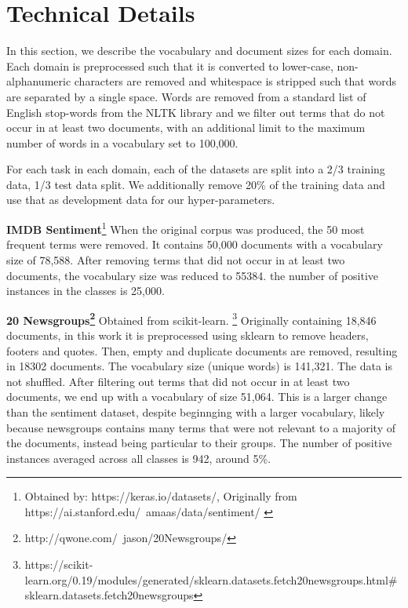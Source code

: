 \section{Technical Details}\label{ch2.5:technical}

In this section, we describe the vocabulary and document sizes for each domain. Each domain is preprocessed such that it is converted to lower-case,  non-alphanumeric characters are removed and whitespace is stripped such that words are separated by a single space. Words are removed from a standard list of English stop-words from the NLTK library \cite{Bird} and we filter out terms that do not occur in at least two documents, with an additional limit to the maximum number of words in a vocabulary set to 100,000. 

For each task in each domain,  each of the datasets are split into a 2/3 training data, 1/3 test data split.  We additionally remove 20\% of the training data and use that as development data for our hyper-parameters. 


\textbf{IMDB Sentiment}\footnote{Obtained by: https://keras.io/datasets/, Originally from https://ai.stanford.edu/~amaas/data/sentiment/ \cite{Maas2011a}} When the original corpus was produced, the 50 most frequent terms were removed. It contains 50,000 documents with a vocabulary size of 78,588. After removing terms that did not occur in at least two documents, the vocabulary size was reduced to 55384.  the number of positive instances in the classes is 25,000.


\textbf{20 Newsgroups\footnote{http://qwone.com/~jason/20Newsgroups/}} Obtained from scikit-learn. \footnote{https://scikit-learn.org/0.19/modules/generated/sklearn.datasets.fetch\textunderscore20newsgroups.html\#sklearn.datasets.fetch\textunderscore20newsgroups} Originally containing 18,846 documents, in this work it is preprocessed using sklearn to remove headers, footers and quotes. Then, empty and duplicate documents are removed, resulting in 18302 documents. The vocabulary size (unique words) is 141,321. The data is not shuffled. After filtering out terms that did not occur in at least two documents, we end up with a vocabulary of size 51,064. This is a larger change  than the sentiment dataset, despite beginnging with a larger vocabulary, likely because newsgroups contains many terms that were not relevant to a majority of the documents, instead being particular to their groups. The number of positive instances averaged across all classes is 942, around 5\%.


